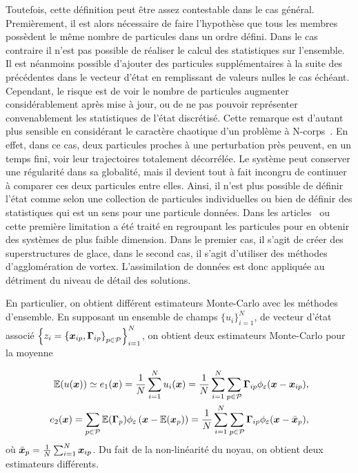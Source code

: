 Toutefois, cette définition peut être assez contestable dans le cas général. Premièrement, il est alors nécessaire de faire l'hypothèse que tous les membres possèdent le même nombre de particules dans un ordre défini. Dans le cas contraire il n'est pas possible de réaliser le calcul des statistiques sur l'ensemble. Il est néanmoins possible d'ajouter des particules supplémentaires à la suite des précédentes dans le vecteur d'état en remplissant de valeurs nulles le cas échéant. Cependant, le risque est de voir le nombre de particules augmenter considérablement après mise à jour, ou de ne pas pouvoir représenter convenablement les statistiques de l'état discrétisé. Cette remarque est d'autant plus sensible en considérant le caractère chaotique d'un problème à N-corps~\cite{poincare1890}. En effet, dans ce cas, deux particules proches à une perturbation près peuvent, en un temps fini, voir leur trajectoires totalement décorrélée. Le système peut conserver une régularité dans sa globalité, mais il devient tout à fait incongru de continuer à comparer ces deux particules entre elles. Ainsi, il n'est plus possible de définir l'état comme selon une collection de particules individuelles ou bien de définir des statistiques qui est un sens pour une particule données.
Dans les articles~\cite{chen_superfloe_2022} ou~\cite{darakananda_data-assimilated_2018} cette première limitation a été traité en regroupant les particules pour en obtenir des systèmes de plus faible dimension. Dans le premier cas, il s'agit de créer des superstructures de glace, dans le second cas, il s'agit d'utiliser des méthodes d'agglomération de vortex. L'assimilation de données est donc appliquée au détriment du niveau de détail des solutions.

En particulier, on obtient différent estimateurs Monte-Carlo avec les méthodes d'ensemble. En supposant un ensemble de champs $\{u_i\}_{i=1}^N$, de vecteur d'état associé $\left\{z_i = \left\{\bm{x}_{ip},\bm \Gamma_{ip}\right\}_ {p \in \mathcal P}\right\}_{i=1}^N$, on obtient deux estimateurs Monte-Carlo pour la moyenne

\begin{eqnarray*}
    \mathbb{E}(u(\bm x)) \simeq e_1(\bm x) =\frac{1}{N} \sum_{i=1}^N u_i(\bm x) = \frac{1}{N} \sum_{i=1}^N \sum_{p \in \mathcal P}\bm \Gamma_{ip} \phi_\varepsilon(\bm x - \bm{x}_{ip}), \\
    e_2(\bm x) = \sum_{p \in \mathcal P} \mathbb{E}(\bm \Gamma_{p}) \phi_\varepsilon\left(\bm x - \mathbb{E}(\bm{x}_{p})\right) =\frac{1}{N} \sum_{i=1}^N \sum_{p \in \mathcal P} \bm \Gamma_{ip} \phi_\varepsilon(\bm x - \bar{\bm{x}}_{p}),
\end{eqnarray*} où $ \bar{\bm{x}}_{p} = \frac1N \sum_{i=1}^{N} \bm{x}_{ip}$. Du fait de la non-linéarité du noyau, on obtient deux estimateurs différents.
